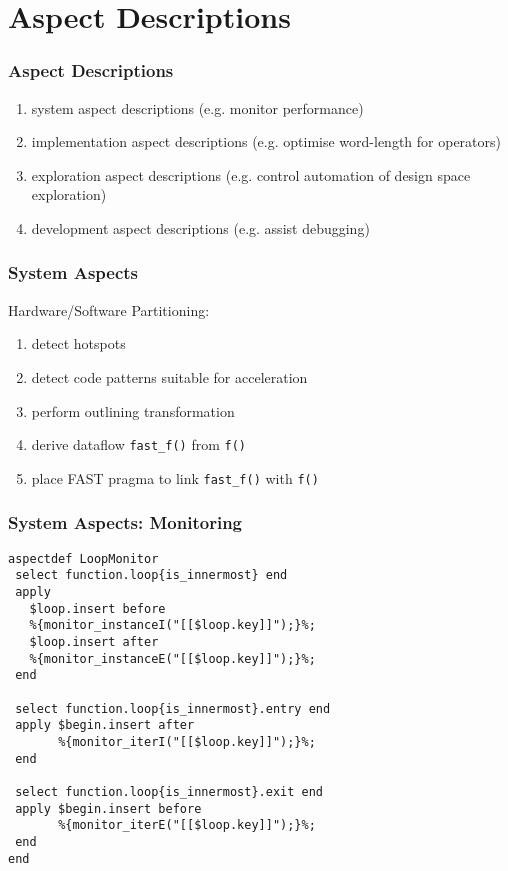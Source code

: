 \section{Aspect Descriptions}
\begin{frame}
  \frametitle{Aspect Descriptions}
\begin{enumerate}
  \item  system aspect descriptions (e.g. monitor performance)
  \item implementation aspect descriptions (e.g. optimise word-length for operators)
  \item exploration aspect descriptions (e.g. control automation of design space exploration)
  \item development aspect descriptions (e.g. assist debugging)
\end{enumerate}

\end{frame}


\begin{frame}
  \frametitle{System Aspects}
Hardware/Software Partitioning:
\begin{enumerate}
  \item detect hotspots
  \item detect code patterns suitable for acceleration
  \item perform outlining transformation
  \item derive dataflow \texttt{fast\_f()} from \texttt{f()}
  \item place FAST pragma to link \texttt{fast\_f()} with \texttt{f()}
\end{enumerate}
\end{frame}


\begin{frame}[fragile]
  \frametitle{System Aspects: Monitoring}
\begin{lstlisting}[label=lst:label, style=lara]
aspectdef LoopMonitor
 select function.loop{is_innermost} end
 apply
   $loop.insert before
   %{monitor_instanceI("[[$loop.key]]");}%;
   $loop.insert after
   %{monitor_instanceE("[[$loop.key]]");}%;
 end

 select function.loop{is_innermost}.entry end
 apply $begin.insert after
       %{monitor_iterI("[[$loop.key]]");}%;
 end

 select function.loop{is_innermost}.exit end
 apply $begin.insert before
       %{monitor_iterE("[[$loop.key]]");}%;
 end
end
\end{lstlisting}
\end{frame}

